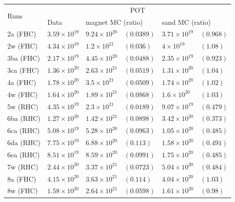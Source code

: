 \begin{table}[ht]
  \begin{adjustbox}{center}
    \begin{tabular}{llllll}
      \toprule
      \multirow{2}{*}{Runs} & \multicolumn{5}{c}{POT}\\
                            & Data & \multicolumn{2}{l}{\Gls{magnet} \Gls{MC} (ratio)} & \multicolumn{2}{l}{\Gls{sand} \Gls{MC} (ratio)} \\
      \midrule
      2a  (\Gls{FHC}) & $3.59\times 10^{19}$ & $9.24\times 10^{20}$&$(0.0389)$ & $3.71\times 10^{19}$&$(0.968)$ \\
      2w  (\Gls{FHC}) & $4.34\times 10^{19}$ & $1.2 \times 10^{21}$&$(0.036) $ & $4   \times 10^{19}$&$(1.08) $ \\
      3ba (\Gls{FHC}) & $2.17\times 10^{19}$ & $4.45\times 10^{20}$&$(0.0488)$ & $2.35\times 10^{19}$&$(0.923)$ \\
      3ca (\Gls{FHC}) & $1.36\times 10^{20}$ & $2.63\times 10^{21}$&$(0.0519)$ & $1.31\times 10^{20}$&$(1.04) $ \\
      4a  (\Gls{FHC}) & $1.78\times 10^{20}$ & $3.5 \times 10^{21}$&$(0.0509)$ & $1.74\times 10^{20}$&$(1.02) $ \\
      4w  (\Gls{FHC}) & $1.64\times 10^{20}$ & $1.89\times 10^{21}$&$(0.0868)$ & $1.6 \times 10^{20}$&$(1.03) $ \\
      5w  (\Gls{RHC}) & $4.35\times 10^{19}$ & $2.3 \times 10^{21}$&$(0.0189)$ & $9.07\times 10^{19}$&$(0.479)$ \\
      6ba (\Gls{RHC}) & $1.27\times 10^{20}$ & $1.42\times 10^{21}$&$(0.0898)$ & $3.42\times 10^{20}$&$(0.373)$ \\
      6ca (\Gls{RHC}) & $5.08\times 10^{19}$ & $5.28\times 10^{20}$&$(0.0963)$ & $1.05\times 10^{20}$&$(0.485)$ \\
      6da (\Gls{RHC}) & $7.75\times 10^{19}$ & $6.88\times 10^{20}$&$(0.113) $ & $1.58\times 10^{20}$&$(0.491)$ \\
      6ea (\Gls{RHC}) & $8.51\times 10^{19}$ & $8.59\times 10^{20}$&$(0.0991)$ & $1.75\times 10^{20}$&$(0.485)$ \\
      7w  (\Gls{RHC}) & $2.44\times 10^{20}$ & $3.37\times 10^{21}$&$(0.0723)$ & $5.04\times 10^{20}$&$(0.484)$ \\
      8a  (\Gls{FHC}) & $4.15\times 10^{20}$ & $3.63\times 10^{21}$&$(0.114) $ & $4.04\times 10^{20}$&$(1.03) $ \\
      8w  (\Gls{FHC}) & $1.58\times 10^{20}$ & $2.64\times 10^{21}$&$(0.0598)$ & $1.61\times 10^{20}$&$(0.98) $ \\

\end{tabular}
\end{adjustbox}
\end{table}
